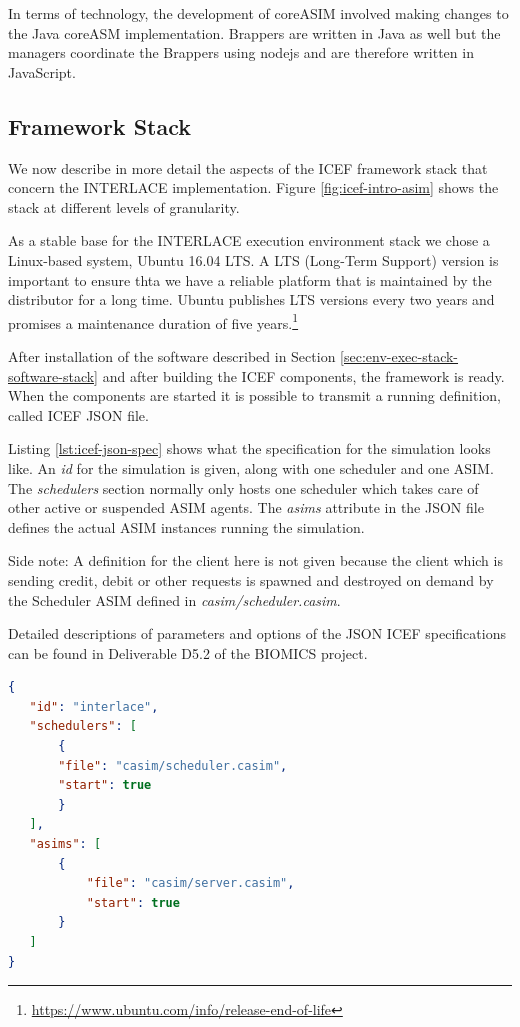 In terms of technology, the development of coreASIM involved making changes to the Java coreASM implementation. Brappers are written in Java as well but the managers coordinate the Brappers using nodejs and are therefore written in JavaScript.

\subsection{Framework Stack}

We now describe in more detail the aspects of the ICEF framework stack that concern the INTERLACE implementation. Figure \ref{fig:icef-intro-asim} shows the stack at different levels of granularity.

As a stable base for the INTERLACE execution environment stack we chose a Linux-based system, Ubuntu 16.04 LTS. A LTS (Long-Term Support) version is important to ensure thta we have a reliable platform that is maintained by the distributor for a long time. Ubuntu publishes LTS versions every two years and promises a maintenance duration of five years.\footnote{\url{https://www.ubuntu.com/info/release-end-of-life}}

After installation of the software described in Section \ref{sec:env-exec-stack-software-stack} and after building the ICEF components, the framework is ready. When the components are started it is possible to transmit a running definition, called ICEF JSON file.

Listing \ref{lst:icef-json-spec} shows what the specification for the simulation looks like. An \textit{id} for the simulation is given, along with one scheduler and one ASIM. The \textit{schedulers} section normally only hosts one scheduler which takes care of other active or suspended ASIM agents. The \textit{asims} attribute in the JSON file defines the actual ASIM instances running the simulation.

Side note: A definition for the client here is not given because the client which is sending credit, debit or other requests is spawned and destroyed on demand by the Scheduler ASIM defined in \textit{casim/scheduler.casim}.

Detailed descriptions of parameters and options of the JSON ICEF specifications can be found in Deliverable D5.2 \cite{BIOMICSD52} of the BIOMICS project.

\begin{minipage}{1.0\textwidth}
\begin{lstlisting}[language=json,firstnumber=1,caption={ICEF JSON Specification for INTERLACE},captionpos=b,label=lst:icef-json-spec]
{
   "id": "interlace", 
   "schedulers": [
       {
	   "file": "casim/scheduler.casim",
	   "start": true
       }
   ], 
   "asims": [       
       {
           "file": "casim/server.casim",
           "start": true
       }
   ]
}
\end{lstlisting}
\end{minipage}

